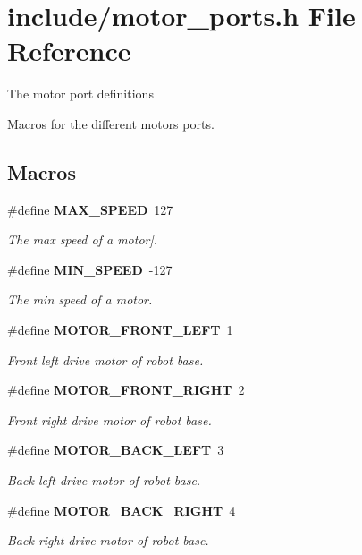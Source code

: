 \section{include/motor\+\_\+ports.h File Reference}
\label{motor__ports_8h}


The motor port definitions

Macros for the different motors ports.  


\subsection*{Macros}
\begin{DoxyCompactItemize}
\item 
\#define \textbf{ M\+A\+X\+\_\+\+S\+P\+E\+ED}~127
\begin{DoxyCompactList}\small\item\em The max speed of a motor]. \end{DoxyCompactList}\item 
\#define \textbf{ M\+I\+N\+\_\+\+S\+P\+E\+ED}~-\/127
\begin{DoxyCompactList}\small\item\em The min speed of a motor. \end{DoxyCompactList}\item 
\#define \textbf{ M\+O\+T\+O\+R\+\_\+\+F\+R\+O\+N\+T\+\_\+\+L\+E\+FT}~1
\begin{DoxyCompactList}\small\item\em Front left drive motor of robot base. \end{DoxyCompactList}\item 
\#define \textbf{ M\+O\+T\+O\+R\+\_\+\+F\+R\+O\+N\+T\+\_\+\+R\+I\+G\+HT}~2
\begin{DoxyCompactList}\small\item\em Front right drive motor of robot base. \end{DoxyCompactList}\item 
\#define \textbf{ M\+O\+T\+O\+R\+\_\+\+B\+A\+C\+K\+\_\+\+L\+E\+FT}~3
\begin{DoxyCompactList}\small\item\em Back left drive motor of robot base. \end{DoxyCompactList}\item 
\#define \textbf{ M\+O\+T\+O\+R\+\_\+\+B\+A\+C\+K\+\_\+\+R\+I\+G\+HT}~4
\begin{DoxyCompactList}\small\item\em Back right drive motor of robot base. \end{DoxyCompactList}\item 

\end{DoxyCompactItemize}
